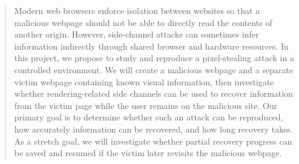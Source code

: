 \begin{abstract}

Modern web browsers enforce isolation between websites so that a malicious webpage should not be able to directly read the contents of another origin. However, side-channel attacks can sometimes infer information indirectly through shared browser and hardware resources. In this project, we propose to study and reproduce a pixel-stealing attack in a controlled environment. We will create a malicious webpage and a separate victim webpage containing known visual information, then investigate whether rendering-related side channels can be used to recover information from the victim page while the user remains on the malicious site. Our primary goal is to determine whether such an attack can be reproduced, how accurately information can be recovered, and how long recovery takes. As a stretch goal, we will investigate whether partial recovery progress can be saved and resumed if the victim later revisits the malicious webpage.

\end{abstract}
